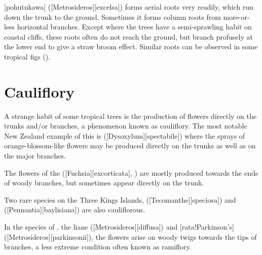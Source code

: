 [pohutukawa] ([Metrosideros][excelsa]) forms aerial roots very readily, which run down the trunk to the ground.
Sometimes it forms column roots from more-or-less horizontal branches.
Except where the trees have a semi-sprawling habit on coastal cliffs, these roots often do not reach the ground, but branch profusely at the lower end to give a straw broom effect.
Similar roots can be observed in some tropical figs ().

\section{Cauliflory}

A strange habit of some tropical trees is the production of flowers directly on the trunks and/or branches, a phenomenon known as cauliflory.
The most notable New Zealand example of this is  ([Dysoxylum][spectabile]) where the sprays of orange-blossom-like flowers may be produced directly on the trunks as well as on the major branches.

The flowers of the  ([Fuchsia][excorticata], ) are mostly produced towards the ends of woody branches, but sometimes appear directly on the trunk.

Two rare species on the Three Kings Islands,  ([Tecomanthe][speciosa]) and  ([Pennantia][baylisiana]) are also cauliflorous.

In the species of ,  the liane  ([Metrosideros][diffusa]) and [rata!Parkinson's] ([Metrosideros][parkinsonii]), the flowers arise on woody twigs towards the tips of branches, a less extreme condition often known as ramiflory.

